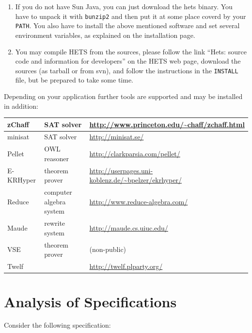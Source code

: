 \documentclass{article}
\newcommand{\normalTEXTSC}[2]{{#1\scriptsize#2}}
\newcommand     {\Hets}{\normalTEXTSC{H}{ETS}\xspace}
\begin{document}
\begin{enumerate}
\item
If you do not have Sun Java, you can just download the hets binary.
You have to unpack it with \texttt{bunzip2} and then put it at
some place coverd by your \texttt{PATH}. You also have to
install the above mentioned software and set
several environment variables, as explained on the installation page.

\item
You may compile \Hets from the sources, please follow the
link ``Hets: source code and information for developers''
on the \Hets web page, download the sources (as tarball or from
svn), and follow the
instructions in the \texttt{INSTALL} file, but be prepared to take some time.
\end{enumerate}

Depending on your application further tools are supported and may be
installed in addition:

\medskip
{\small
\begin{tabular}{|l|l|p{5cm}|}\hline
zChaff & SAT solver & \url{http://www.princeton.edu/~chaff/zchaff.html} \\\hline
minisat & SAT solver & \url{http://minisat.se/} \\\hline
Pellet & OWL reasoner & \url{http://clarkparsia.com/pellet/} \\\hline
E-KRHyper & theorem prover
  & \url{http://userpages.uni-koblenz.de/~bpelzer/ekrhyper/} \\\hline
Reduce & computer algebra system
  & \url{http://www.reduce-algebra.com/} \\\hline
Maude & rewrite system & \url{http://maude.cs.uiuc.edu/} \\\hline
VSE & theorem prover & (non-public) \\\hline
Twelf & & \url{http://twelf.plparty.org/} \\\hline
\end{tabular}
}

\section{Analysis of Specifications}
Consider the following \CASL
specification:
\end{document}
